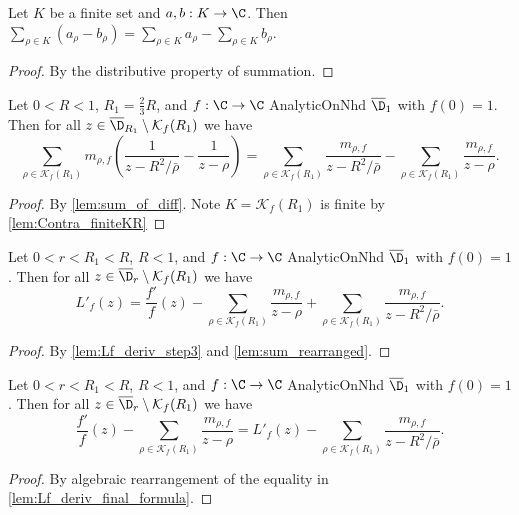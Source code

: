 \begin{lemma}\label{lem:sum_of_diff} 
\leanok
Let $K$ be a finite set and $a, b: K \to \C$. Then $\sum_{\rho \in K} (a_\rho - b_\rho) = \sum_{\rho \in K} a_\rho - \sum_{\rho \in K} b_\rho$.
\end{lemma}
\begin{proof}
\leanok
By the distributive property of summation.
\end{proof}

\begin{lemma}\label{lem:sum_rearranged} 
\leanok
Let $0<R<1$, $R_1=\frac{2}{3}R$, and $f:\C\to\C$ AnalyticOnNhd $\overline{\D}_1$ with $f(0)=1$. Then for all $z\in \overline{\D}_{R_1}\setminus\mathcal K_f(R_1)$ we have
\[\sum_{\rho\in\mathcal K_f(R_1)}m_{\rho,f}\left( \frac{1}{z-R^2/\bar\rho} - \frac{1}{z-\rho}\right) = \sum_{\rho\in\mathcal K_f(R_1)}\frac{m_{\rho,f}}{z-R^2/\bar\rho} - \sum_{\rho\in\mathcal K_f(R_1)}\frac{m_{\rho,f}}{z-\rho}.\]
\end{lemma}
\begin{proof}
\leanok
{}
By \cref{lem:sum_of_diff}.
Note $K=\mathcal K_f(R_1)$ is finite by \cref{lem:Contra_finiteKR}
\end{proof}

\begin{lemma}\label{lem:Lf_deriv_final_formula} 
\leanok
Let $0<r<R_1<R$, $R < 1$, and $f:\C\to\C$ AnalyticOnNhd $\overline{\D}_1$ with $f(0)=1$. Then for all $z\in \overline{\D}_{r}\setminus\mathcal K_f(R_1)$ we have
\[L'_f(z)=\frac{f'}{f}(z) - \sum_{\rho\in\mathcal K_f(R_1)}\frac{m_{\rho,f}}{z-\rho} + \sum_{\rho\in\mathcal K_f(R_1)}\frac{m_{\rho,f}}{z-R^2/\bar\rho}.\]
\end{lemma}
\begin{proof}
\leanok
{}
By \cref{lem:Lf_deriv_step3} and \cref{lem:sum_rearranged}.
\end{proof}

\begin{lemma}\label{lem:rearrange_Lf_deriv} 
\leanok
Let $0<r<R_1<R$, $R < 1$, and $f:\C\to\C$ AnalyticOnNhd $\overline{\D}_1$ with $f(0)=1$. Then for all $z\in \overline{\D}_{r}\setminus\mathcal K_f(R_1)$ we have
\[\frac{f'}{f}(z) - \sum_{\rho\in\mathcal K_f(R_1)}\frac{m_{\rho,f}}{z-\rho} = L'_f(z) - \sum_{\rho\in\mathcal K_f(R_1)}\frac{m_{\rho,f}}{z-R^2/\bar\rho}.\]
\end{lemma}
\begin{proof}
\leanok
{}
By algebraic rearrangement of the equality in \cref{lem:Lf_deriv_final_formula}.
\end{proof}


